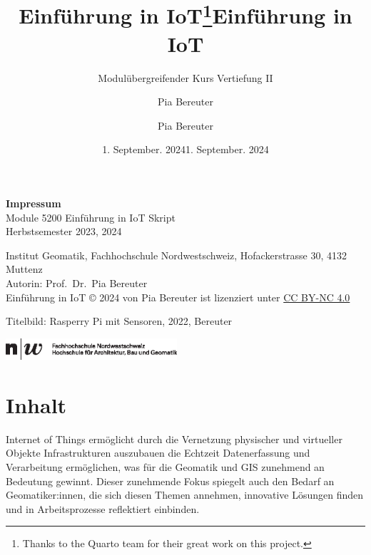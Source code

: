 \documentclass[
  11pt,
  a4paper,
  oneside, openany  ,captions=tableheading
]{scrbook}
\title{Einführung in IoT\thanks{Thanks to the Quarto team for their
great work on this project.}}
\subtitle{Modulübergreifender Kurs Vertiefung II}
\author{Pia Bereuter}
\date{1. September. 2024}
\title{Einführung in IoT}
\author{Pia Bereuter}
\date{1. September. 2024}
\renewcommand*\contentsname{Inhaltsverzeichnis}
\newcommand\contentsname{Inhaltsverzeichnis}
\theoremstyle{remark}
\begin{document}
\clearpage
\thispagestyle{empty}
\makeatletter%
\makeatother%
\clearpage
\thispagestyle{empty}
\vspace*{\fill}
{\footnotesize 
\textbf{Impressum} \\
Module 5200 Einführung in IoT Skript\\
Herbstsemester 2023, 2024

Institut Geomatik, Fachhochschule Nordwestschweiz, Hofackerstrasse 30,
4132 Muttenz\\
Autorin: Prof.~Dr.~Pia Bereuter\\
Einführung in IoT © 2024 von Pia Bereuter ist lizenziert unter
\href{https://creativecommons.org/licenses/by-nc/4.0/}{CC BY-NC 4.0}

Titelbild: Rasperry Pi mit Sensoren, 2022, Bereuter

\includegraphics[height=8mm]{images/fhnw.eps}}
\clearpage

\frontmatter


\renewcommand*\contentsname{Inhaltsverzeichnis}
{
\hypersetup{linkcolor=}
\setcounter{tocdepth}{1}
\tableofcontents
}

%		


\mainmatter
{}

\chapter*{Inhalt}\label{inhalt}


Internet of Things ermöglicht durch die Vernetzung physischer und
virtueller Objekte Infrastrukturen auszubauen die Echtzeit
Datenerfassung und Verarbeitung ermöglichen, was für die Geomatik und
GIS zunehmend an Bedeutung gewinnt. Dieser zunehmende Fokus spiegelt
auch den Bedarf an Geomatiker:innen, die sich diesen Themen annehmen,
innovative Lösungen finden und in Arbeitsprozesse reflektiert einbinden.
\end{document}
